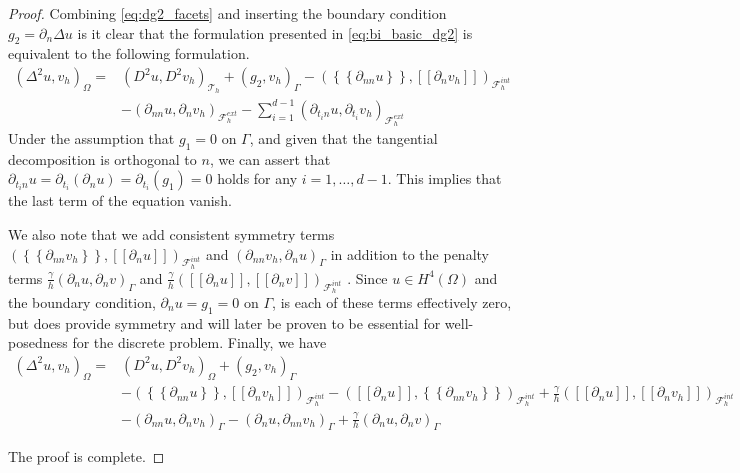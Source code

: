 \documentclass[11pt]{article}
\theoremstyle{remark}
\newcommand{\mean}[1]{\left\{\!\!\left\{#1\right\}\!\!\right\}}
\newcommand{\jump}[1]{\left[\!\left[ #1 \right]\!\right]}
\numberwithin{equation}{section}
\begin{document}
\begin{proof}
Combining \eqref{eq:dg2_facets} and inserting the boundary condition $g_{2} = \partial _{n} \Delta u $ is it clear that the formulation presented in \eqref{eq:bi_basic_dg2} is equivalent to the following formulation.
\begin{equation}
\label{eq:bi_basic_dg_full_1}
\begin{split}
    \left( \Delta  ^{2} u, v_h \right) _{\Omega }  =&   \left( D^2u, D^2v_h \right)_{\mathcal{T} _{h}} +  \left(g_{2}, v_h  \right) _{\Gamma  }  -  ( \mean{ \partial _{nn} u }   , \jump{ \partial_{n} v_h } )_{\mathcal{F}_{h}^{int} } \\
                                                  &  - ( \partial _{nn} u , \partial _{n} v_h)_{\mathcal{F}^{ext}_{h} } - \sum_{i =1  }^{d-1} ( \partial   _{t_{i}n} u  ,  \partial   _{t_{i}}  v_h  )_{ \mathcal{F}^{ext} _{h}  }
\end{split}
\end{equation}
Under the assumption that $g_{1} = 0$ on $\Gamma$, and given that the tangential decomposition is orthogonal to $n$, we can assert that $ \partial_{t_{i} n} u = \partial_{t_{i}} ( \partial _{n} u )= \partial_{t_{i}} ( g_{1} ) = 0 $ holds for any $i =
1,\ldots, d -1$. This implies that the
last term of the equation vanish.

We also note that we add consistent symmetry terms $( \mean{ \partial _{nn} v_h } ,\jump{ \partial _{n} u }    )_{\mathcal{F}^{int}_{h} } $ and $( \partial _{nn} v_h  , \partial _{n} u     )_{\Gamma  } $ in addition to the penalty terms $\frac{\gamma
}{h} ( \partial _{n} u, \partial _{n}v)_{\Gamma }  $ and $\frac{\gamma
}{h} ( \jump{ \partial _{n} u }  , \jump{    \partial _{n}v})_{\mathcal{F}^{int}_{h} }  $ . Since $u\in H^{4}( \Omega ) $ and the boundary condition,  $\partial _{n} u = g_{1}=0$ on $\Gamma $, is each of these terms effectively zero, but does provide symmetry and will later
be proven to be essential for well-posedness for the discrete problem. Finally, we have
\begin{equation}
\begin{split}
    \left( \Delta  ^{2} u, v_h \right) _{\Omega }  =&   \left( D^2u, D^2v_h \right)_{\Omega } + \left(g_{2}, v_h  \right) _{ \Gamma  }\\
    &    -  ( \mean{ \partial _{nn} u }   , \jump{ \partial_{n} v_h } )_{\mathcal{F}_{h}^{int} } -  (  \jump{ \partial_{n} u
    },\mean{ \partial _{nn} v_h } )_{\mathcal{F}_{h}^{int} } + \frac{\gamma }{h}  (  \jump{ \partial_{n} u },\jump{ \partial _{n} v_h } )_{\mathcal{F}_{h}^{int} } \\
    & - ( \partial _{nn} u , \partial _{n} v_h)_{\Gamma  } - (\partial _{n} u, \partial _{nn} v_h )_{\Gamma  }  + \frac{\gamma }{h}  \left(  \partial _{n} u,  \partial _{n} v      \right)_{\Gamma }
\end{split}
\end{equation}

The proof is complete.

\end{proof}
\end{document}
